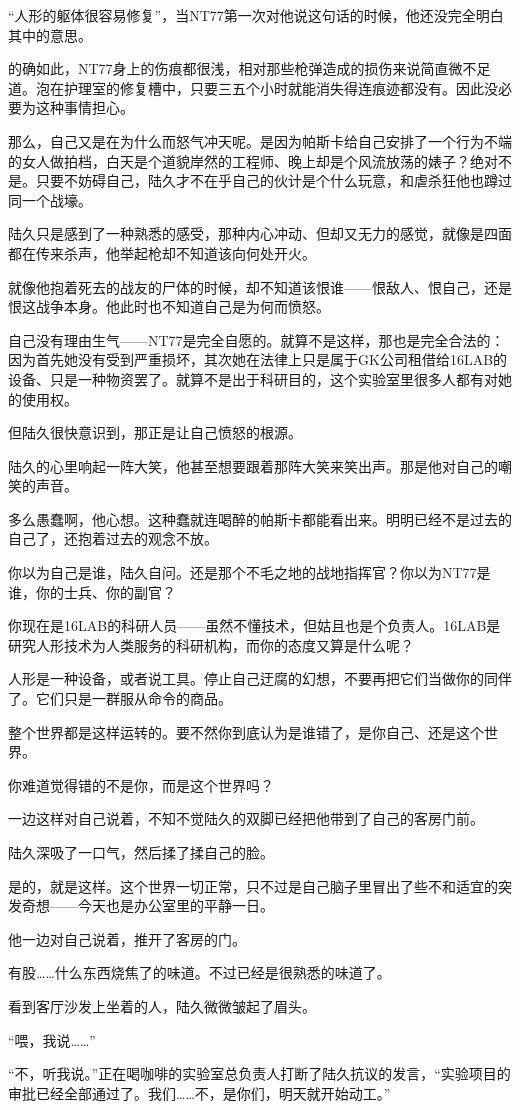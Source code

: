 “人形的躯体很容易修复”，当NT77第一次对他说这句话的时候，他还没完全明白其中的意思。

的确如此，NT77身上的伤痕都很浅，相对那些枪弹造成的损伤来说简直微不足道。泡在护理室的修复槽中，只要三五个小时就能消失得连痕迹都没有。因此没必要为这种事情担心。

那么，自己又是在为什么而怒气冲天呢。是因为帕斯卡给自己安排了一个行为不端的女人做拍档，白天是个道貌岸然的工程师、晚上却是个风流放荡的婊子？绝对不是。只要不妨碍自己，陆久才不在乎自己的伙计是个什么玩意，和虐杀狂他也蹲过同一个战壕。

陆久只是感到了一种熟悉的感受，那种内心冲动、但却又无力的感觉，就像是四面都在传来杀声，他举起枪却不知道该向何处开火。

就像他抱着死去的战友的尸体的时候，却不知道该恨谁——恨敌人、恨自己，还是恨这战争本身。他此时也不知道自己是为何而愤怒。

自己没有理由生气——NT77是完全自愿的。就算不是这样，那也是完全合法的：因为首先她没有受到严重损坏，其次她在法律上只是属于GK公司租借给16LAB的设备、只是一种物资罢了。就算不是出于科研目的，这个实验室里很多人都有对她的使用权。

但陆久很快意识到，那正是让自己愤怒的根源。

陆久的心里响起一阵大笑，他甚至想要跟着那阵大笑来笑出声。那是他对自己的嘲笑的声音。

多么愚蠢啊，他心想。这种蠢就连喝醉的帕斯卡都能看出来。明明已经不是过去的自己了，还抱着过去的观念不放。

你以为自己是谁，陆久自问。还是那个不毛之地的战地指挥官？你以为NT77是谁，你的士兵、你的副官？

你现在是16LAB的科研人员——虽然不懂技术，但姑且也是个负责人。16LAB是研究人形技术为人类服务的科研机构，而你的态度又算是什么呢？

人形是一种设备，或者说工具。停止自己迂腐的幻想，不要再把它们当做你的同伴了。它们只是一群服从命令的商品。

整个世界都是这样运转的。要不然你到底认为是谁错了，是你自己、还是这个世界。

你难道觉得错的不是你，而是这个世界吗？

一边这样对自己说着，不知不觉陆久的双脚已经把他带到了自己的客房门前。

陆久深吸了一口气，然后揉了揉自己的脸。

是的，就是这样。这个世界一切正常，只不过是自己脑子里冒出了些不和适宜的突发奇想——今天也是办公室里的平静一日。

他一边对自己说着，推开了客房的门。

有股……什么东西烧焦了的味道。不过已经是很熟悉的味道了。

看到客厅沙发上坐着的人，陆久微微皱起了眉头。

“喂，我说……”

“不，听我说。”正在喝咖啡的实验室总负责人打断了陆久抗议的发言，“实验项目的审批已经全部通过了。我们……不，是你们，明天就开始动工。”